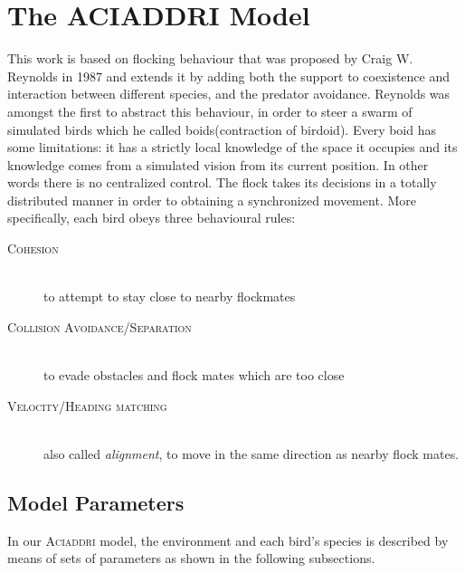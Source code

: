 \section{The ACIADDRI Model}
\label{sect:aciaddri}

This work is  based on flocking behaviour that was proposed by Craig W. Reynolds
in 1987 and extends it by adding both the support to coexistence and interaction
between different species, and the predator avoidance.
Reynolds was amongst the first to abstract this behaviour, in order to steer a swarm
of simulated birds which he called boids\cite{Reynolds}(contraction of birdoid).
Every boid has some limitations:
it has a strictly local knowledge of the space it occupies and its knowledge
comes from a simulated vision from its current position. In other words there is
no centralized control. The flock takes its decisions in a totally distributed
manner in order to obtaining a synchronized movement. More specifically, each bird obeys three behavioural rules:

\begin{description}
	\item[\textsc{Cohesion}] \hfill\\
	to attempt to stay close to nearby flockmates
	\item[\textsc{Collision Avoidance/Separation}] \hfill\\
	to evade obstacles and flock mates which are too
	close
	\item[\textsc{Velocity/Heading matching}] \hfill\\
	also called \textit{alignment}, to move in the same direction as nearby flock
	mates.
\end{description}

\subsection{Model Parameters}
In our \textsc{Aciaddri} model, the environment and each bird's species is described by
means of sets of parameters as shown in the following subsections.

